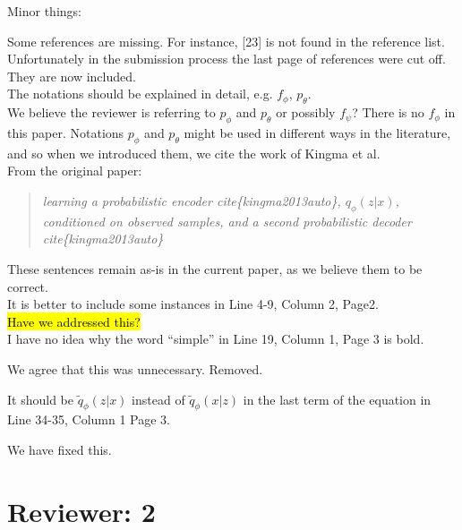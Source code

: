 \documentclass[a4paper,11pt]{article}
\begin{document}
Minor things: \newline

{\color{blue}
Some references are missing. For instance, [23] is not found in the reference list.}\\

Unfortunately in the submission process the last page of references were cut off. They are now included.\\

{\color{blue}
The notations should be explained in detail, e.g. $f_\phi$, $p_\theta$.} \\

We believe the reviewer is referring to $p_\phi$ and $p_\theta$ or possibly $f_\psi$? There is no $f_\phi$ in this paper. Notations $p_\phi$ and $p_\theta$ might be used in different ways in the literature, and so when we introduced them, we cite the work of Kingma et al.\\

From the original paper:
\begin{quote}
    {\it learning a \textit{probabilistic encoder} cite\{kingma2013auto\}, $q_\phi(z|x)$, conditioned on observed samples, and a second \textit{probabilistic decoder} cite\{kingma2013auto\}}
\end{quote} 
These sentences remain as-is in the current paper, as we believe them to be correct.\\

{\color{blue}
It is better to include some instances in Line 4-9, Column 2, Page2.}\\

\hl{Have we addressed this?}\\

{\color{blue}
I have no idea why the word “simple” in Line 19, Column 1, Page 3 is bold.}\newline

We agree that this was unnecessary.  Removed. \newline

{\color{blue}
It should be $\tilde q_\phi(z|x)$ instead of $\tilde q_\phi(x|z)$ in the last term of the equation in Line 34-35, Column 1 Page 3. }\newline

We have fixed this.

\section{Reviewer: 2}
\end{document}
